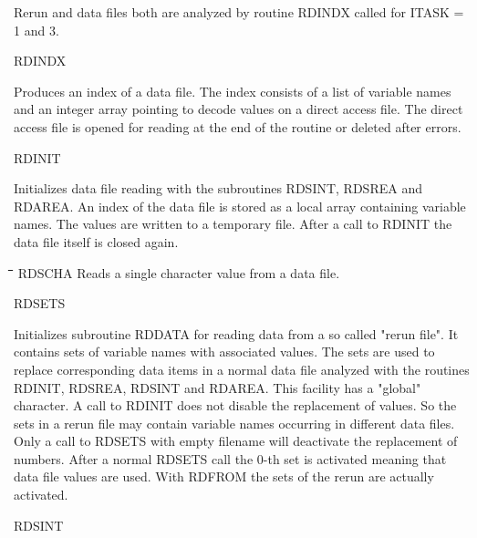 \documentclass[11pt]{article}
\begin{document}
\zerotestlastline
\begin{indenting}{2.54cm}
Rerun and data files both are analyzed by routine RDINDX called for
ITASK = 1 and 3.
\end{indenting}
RDINDX
\testlastline

\begin{indenting}{2.54cm}
Produces an index of a data file. The index consists of a list of variable
names and an integer array pointing to decode values on a direct access
file. The direct access file is opened for reading at the end of the routine or
deleted after errors.
\end{indenting}
RDINIT
\testlastline

\begin{indenting}{2.54cm}
Initializes data file reading with the subroutines RDSINT, RDSREA and
RDAREA. An index of the data file is stored as a local array containing
variable names. The values are written to a temporary file. After a call to
RDINIT the data file itself is closed again.
\end{indenting}
\begin{tabbing}
\hspace{1.27cm}\=\hspace{1.27cm}\=\hspace{1.27cm}\=\hspace{1.27cm}\=%
\hspace{1.27cm}\=\hspace{1.27cm}\=\hspace{1.27cm}\=\hspace{1.27cm}\=%
\hspace{1.27cm}\=\hspace{1.27cm}\=\kill
RDSCHA\> \> Reads a single character value from a data file.
\end{tabbing}

\bigskip
RDSETS
\testlastline

\begin{indenting}{2.54cm}
Initializes subroutine RDDATA for reading data from a so called "rerun
file". It contains sets of variable names with associated values. The sets are
used to replace corresponding data items in a normal data file analyzed
with the routines RDINIT, RDSREA, RDS\-INT and RDAREA. This facility
has a "global" character. A call to RDINIT does not disable the replace\-ment of values. So the sets in a rerun file may contain variable names
occurring in different data files. Only a call to RDSETS with empty
filename will deactivate the re\-placement of numbers. After a normal
RDSETS call the 0-th set is activated meaning that data file values are
used. With RDFROM the sets of the rerun are actually activated.
\end{indenting}
RDSINT
\testlastline
\end{document}
